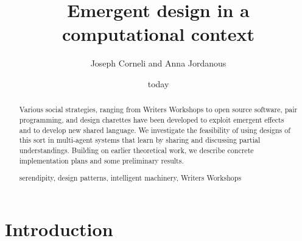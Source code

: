 \documentclass{llncs}
\newcommand{\keywords}[1]{\par\addvspace\baselineskip
\noindent\keywordname\enspace\ignorespaces#1}
\begin{document}
\title{Emergent design in a computational context}

\author{Joseph Corneli and Anna Jordanous}


\date{today}

\maketitle

\begin{abstract} 
Various social strategies, ranging from Writers Workshops to open
source software, pair programming, and design charettes have been
developed to exploit emergent effects and to develop new shared
language.  We investigate the feasibility of using designs of this
sort in multi-agent systems that learn by sharing and discussing
partial understandings.  Building on earlier theoretical work, we
describe concrete implementation plans and some preliminary results.
%
\keywords{serendipity,
design patterns,
intelligent machinery,
Writers Workshops}
\end{abstract}

\section{Introduction} \label{sec:introduction}

%
%
%
\end{document}
